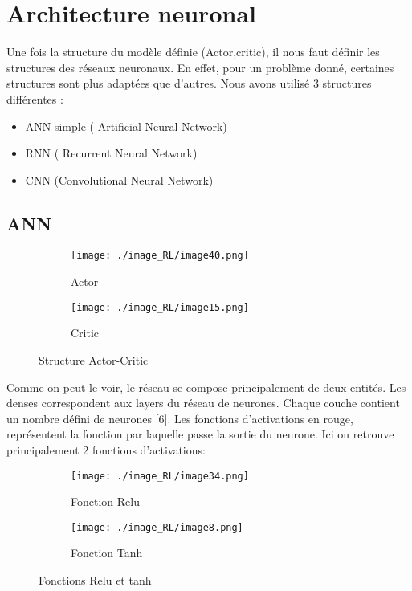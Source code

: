 \section{Architecture neuronal}
Une fois la structure du modèle définie (Actor,critic), il nous faut définir les structures des réseaux neuronaux.
En effet, pour un problème donné, certaines structures sont plus adaptées que d’autres.
Nous avons utilisé 3 structures différentes :

\begin{itemize}
    \item ANN simple ( Artificial Neural Network)
    \item RNN ( Recurrent Neural Network)
    \item CNN (Convolutional Neural Network)
\end{itemize}

\subsection{ANN}

\begin{figure}[H]
    \begin{subfigure}[b]{0.45\textwidth}
        \centering
        \texttt{[image: ./image\_RL/image40.png]}
        \caption{Actor}
    \end{subfigure}
    \hfill
    \begin{subfigure}[b]{0.45\textwidth}
        \centering
        \texttt{[image: ./image\_RL/image15.png]}
        \caption{Critic}
    \end{subfigure}
    \caption{Structure Actor-Critic}
\end{figure}

Comme on peut le voir, le réseau se compose principalement de deux entités.
Les denses correspondent aux layers du réseau de neurones. Chaque couche contient un nombre défini de neurones [6].
Les fonctions d’activations en rouge, représentent la fonction par laquelle passe la sortie du neurone.
Ici on retrouve principalement 2 fonctions d’activations:

\begin{figure}[H]
    \begin{subfigure}[b]{0.45\textwidth}
        \centering
        \texttt{[image: ./image\_RL/image34.png]}
        \caption{Fonction Relu}
    \end{subfigure}
    \hfill
    \begin{subfigure}[b]{0.45\textwidth}
        \centering
        \texttt{[image: ./image\_RL/image8.png]}
        \caption{Fonction Tanh}
    \end{subfigure}
    \caption{Fonctions Relu et tanh}
\end{figure}

